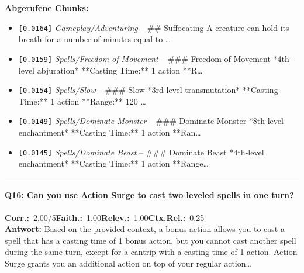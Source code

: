 \noindent\textbf{Abgerufene Chunks:}
\begin{itemize}[noitemsep, topsep=2pt]
  \item[\textbf{\#1}] \texttt{[0.0164]} \textit{Gameplay/Adventuring} -- \#\# Suffocating  A creature can hold its breath for a number of minutes equal to \ldots
  \item[\textbf{\#2}] \texttt{[0.0159]} \textit{Spells/Freedom of Movement} -- \#\#\# Freedom of Movement  *4th-level abjuration*  **Casting Time:** 1 action  **R\ldots
  \item[\textbf{\#3}] \texttt{[0.0154]} \textit{Spells/Slow} -- \#\#\# Slow  *3rd-level transmutation*  **Casting Time:** 1 action  **Range:** 120 \ldots
  \item[\textbf{\#4}] \texttt{[0.0149]} \textit{Spells/Dominate Monster} -- \#\#\# Dominate Monster  *8th-level enchantment*  **Casting Time:** 1 action  **Ran\ldots
  \item[\textbf{\#5}] \texttt{[0.0145]} \textit{Spells/Dominate Beast} -- \#\#\# Dominate Beast  *4th-level enchantment*  **Casting Time:** 1 action  **Range\ldots
\end{itemize}
\vspace{4pt}
\hrule
\vspace{6pt}

\paragraph{Q16: Can you use Action Surge to cast two leveled spells in one turn?}
\noindent \textbf{Corr.:}~2.00/5\quad \textbf{Faith.:}~1.00\quad \textbf{Relev.:}~1.00\quad \textbf{Ctx.Rel.:}~0.25\\

\noindent\textbf{Antwort:} Based on the provided context, a bonus action allows you to cast a spell that has a casting time of 1 bonus action, but you cannot cast another spell during the same turn, except for a cantrip with a casting time of 1 action. Action Surge grants you an additional action on top of your regular action\ldots

